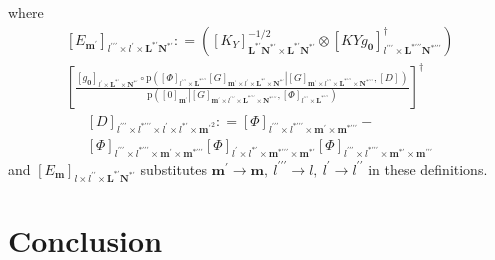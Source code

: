 \documentclass[preprint,12pt]{elsarticle}
\newcommand*{\M}[1]{\ensuremath{#1}\xspace}
\newcommand*{\x}{\times}
\newcommand*{\mi}[1]{\mathbf{#1}}
\newcommand*{\te}[2][]{\left\lbrack{#2}\right\rbrack_{#1}}
\newcommand*{\prob}[3]{\M{\mathrm{p}\!\left(\left.{#1}\right\vert{#2,#3}\right)}}
\newcommand*{\deq}{\M{\mathrel{\mathop:}=}}
\begin{document}
        where
        \begin{multline*}
            \te[l^{\prime\prime\prime}\x l^{\prime}\x \mi{L^{*\prime}N^{*\prime}}]{E_{\mi{m^{\prime}}}} \deq 
            \left(
                \te[\mi{L^{*\prime}N^{*\prime}}\x\mi{L^{*\prime}N^{*\prime}}]{K_{Y}}^{-1/2} \otimes \te[l^{\prime\prime\prime}\x\mi{L^{*\prime\prime\prime}N^{*\prime\prime\prime}}]{KY\!g_{\mi{0}}}^{\dagger} \right) \\
            \left\lbrack\frac{
            \te[l^{\prime}\x\mi{L^{*\prime}}\x\mi{N^{*\prime}}]{g_{\mi{0}}} \circ
            \prob
            {\te[l^{\prime\prime\prime}\x \mi{L^{*\prime\prime\prime}}]{\Phi} 
            \te[\mi{m^{\prime}}\x l^{\prime}\x \mi{L^{*\prime}\x N^{*\prime}}]{G}}
            {\te[\mi{m^{\prime}}\x l^{\prime\prime\prime}\x \mi{L^{*\prime\prime\prime}\x N^{*\prime\prime\prime}}]{G}}
            {\te[]{D}}}
            {\prob{\te[\mi{m^{\prime}}]{0}}{\te[\mi{m^{\prime}}\x l^{\prime\prime\prime}\x \mi{L^{*\prime\prime\prime}\x N^{*\prime\prime\prime}}]{G}}{\te[l^{\prime\prime\prime}\x \mi{L^{*\prime\prime\prime}}]{\Phi}}} \right\rbrack^{\dagger}
        \end{multline*}
        \begin{multline*}
            \te[l^{\prime\prime\prime} \x l^{*\prime\prime\prime}\x l^{\prime}\x l^{*\prime}\x\mi{m^{\prime}}^{2}]{D} \deq \te[l^{\prime\prime\prime}\x l^{*\prime\prime\prime}\x\mi{m^{\prime}}\x\mi{m^{*\prime\prime\prime}}]{\Phi} -  \\ 
            \te[l^{\prime\prime\prime}\x l^{*\prime\prime\prime}\x\mi{m^{\prime}}\x\mi{m^{*\prime\prime\prime}}]{\Phi}
            \te[l^{\prime}\x l^{*\prime}\x\mi{m^{*\prime\prime\prime}}\x\mi{m^{*\prime}}]{\Phi}
            \te[l^{\prime\prime\prime}\x l^{*\prime\prime\prime}\x\mi{m^{*\prime}}\x\mi{m^{\prime\prime\prime}}]{\Phi}
        \end{multline*}
        and $\te[l\x l^{\prime\prime}\x \mi{L^{*\prime}N^{*\prime}}]{E_{\mi{m}}}$ substitutes $\mi{m^{\prime}}\rightarrow\mi{m},\ l^{\prime\prime\prime}\rightarrow l,\ l^{\prime}\rightarrow l^{\prime\prime}$ in these definitions.

\section{Conclusion}\label{sec:Conc}




 

\end{document}
